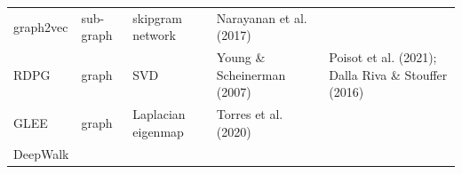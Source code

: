 \documentclass[11pt]{article}
\begin{document}
\begin{longtable}[]{@{}lllll@{}}
\begin{minipage}[t]{0.09\columnwidth}
graph2vec\strut
\end{minipage} & \begin{minipage}[t]{0.11\columnwidth}\raggedright
sub-graph\strut
\end{minipage} & \begin{minipage}[t]{0.23\columnwidth}\raggedright
skipgram network\strut
\end{minipage} & \begin{minipage}[t]{0.14\columnwidth}\raggedright
Narayanan et al. (2017)\strut
\end{minipage} & \begin{minipage}[t]{0.29\columnwidth}\raggedright
\strut
\end{minipage}\tabularnewline
\begin{minipage}[t]{0.09\columnwidth}\raggedright
RDPG\strut
\end{minipage} & \begin{minipage}[t]{0.11\columnwidth}\raggedright
graph\strut
\end{minipage} & \begin{minipage}[t]{0.23\columnwidth}\raggedright
SVD\strut
\end{minipage} & \begin{minipage}[t]{0.14\columnwidth}\raggedright
Young \& Scheinerman (2007)\strut
\end{minipage} & \begin{minipage}[t]{0.29\columnwidth}\raggedright
Poisot et al. (2021); Dalla Riva \& Stouffer (2016)\strut
\end{minipage}\tabularnewline
\begin{minipage}[t]{0.09\columnwidth}\raggedright
GLEE\strut
\end{minipage} & \begin{minipage}[t]{0.11\columnwidth}\raggedright
graph\strut
\end{minipage} & \begin{minipage}[t]{0.23\columnwidth}\raggedright
Laplacian eigenmap\strut
\end{minipage} & \begin{minipage}[t]{0.14\columnwidth}\raggedright
Torres et al. (2020)\strut
\end{minipage} & \begin{minipage}[t]{0.29\columnwidth}\raggedright
\strut
\end{minipage}\tabularnewline
\begin{minipage}[t]{0.09\columnwidth}\raggedright
DeepWalk\strut
\end{minipage} & \begin{minipage}[t]{0.11\columnwidth}\raggedright

\end{minipage}
\end{longtable}
\end{document}

